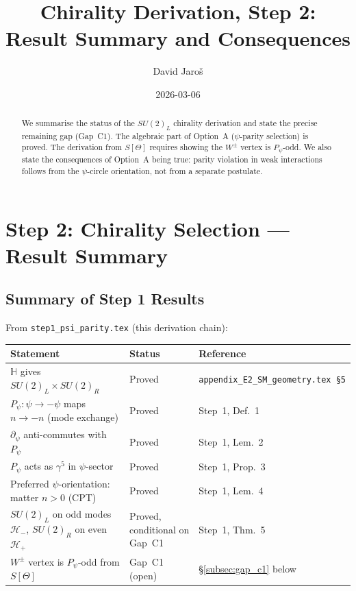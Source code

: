 \documentclass[12pt,a4paper]{article}
\title{\textbf{Chirality Derivation, Step 2: Result Summary and Consequences}}
\author{David Jaro\v{s}}
\date{2026-03-06}
\theoremstyle{definition}
\theoremstyle{remark}
\begin{document}
  \maketitle

  \begin{abstract}
  We summarise the status of the $SU(2)_L$ chirality derivation and state
  the precise remaining gap (Gap~C1).  The algebraic part of Option~A
  ($\psi$-parity selection) is proved.  The derivation from $S[\Theta]$
  requires showing the $W^\pm$ vertex is $P_\psi$-odd.  We also state
  the consequences of Option~A being true: parity violation in weak
  interactions follows from the $\psi$-circle orientation, not from a
  separate postulate.
  \end{abstract}
\fi

\section{Step 2: Chirality Selection --- Result Summary}
\label{sec:chirality_result}

\subsection{Summary of Step 1 Results}
\label{subsec:step1_summary}

From \texttt{step1\_psi\_parity.tex} (this derivation chain):

\begin{center}
\begin{tabular}{lll}
  \toprule
  \textbf{Statement} & \textbf{Status} & \textbf{Reference} \\
  \midrule
  $\mathbb{H}$ gives $SU(2)_L\times SU(2)_R$
    & Proved & \texttt{appendix\_E2\_SM\_geometry.tex~§5} \\
  $P_\psi:\psi\to-\psi$ maps $n\to-n$ (mode exchange)
    & Proved & Step~1, Def.~1 \\
  $\partial_\psi$ anti-commutes with $P_\psi$
    & Proved & Step~1, Lem.~2 \\
  $P_\psi$ acts as $\gamma^5$ in $\psi$-sector
    & Proved & Step~1, Prop.~3 \\
  Preferred $\psi$-orientation: matter $n>0$ (CPT)
    & Proved & Step~1, Lem.~4 \\
  $SU(2)_L$ on odd modes $\mathcal{H}_-$, $SU(2)_R$ on even $\mathcal{H}_+$
    & Proved, conditional on Gap~C1 & Step~1, Thm.~5 \\
  $W^\pm$ vertex is $P_\psi$-odd from $S[\Theta]$
    & Gap~C1 (open) & \S\ref{subsec:gap_c1} below \\
  \bottomrule
\end{tabular}
\end{center}
\end{document}
